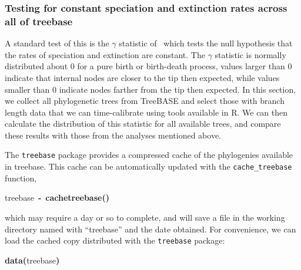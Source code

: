 \documentclass[authoryear, preprint]{elsarticle}
\makeatletter
\newcommand{\hlfunctioncall}[1]{\textcolor[rgb]{.5,0,.33}{\textbf{#1}}}%
\newcommand{\hlkeyword}[1]{\textbf{#1}}%
\newcommand{\hlassignement}[1]{\textbf{#1}}%
\newcommand{\hlsymbol}[1]{#1}%
\newenvironment{kframe}{%
 \def\FrameCommand##1{\hskip\@totalleftmargin \hskip-\fboxsep
 \colorbox{shadecolor}{##1}\hskip-\fboxsep
     \hskip-\linewidth \hskip-\@totalleftmargin \hskip\columnwidth}%
 \MakeFramed {\advance\hsize-\width
   \@totalleftmargin\z@ \linewidth\hsize
   \@setminipage}}%
 {\par\unskip\endMakeFramed}
\newenvironment{knitrout}{}{} %
\makeatother
\begin{document}
\subsubsection*{Testing for constant speciation and extinction rates across all of treebase}
A standard test of this is the $\gamma$ statistic of~\citet{Pybus2000}
which tests the null hypothesis that the rates of speciation and extinction are constant. 
The $\gamma$ statistic is normally distributed about 0 for a pure birth or birth-death process,
values larger than 0 indicate that internal nodes are closer to the tip then expected, 
while values smaller than 0 indicate nodes farther from the tip then expected.  
In this section, we collect all phylogenetic trees from TreeBASE and select those 
with branch length data that we can time-calibrate using tools available in R.
We can then calculate the distribution of this statistic for all available trees, 
and compare these results with those from the analyses mentioned above.  

The \texttt{treebase} package provides a compressed cache of the phylogenies available in treebase.  
This cache can be automatically updated with the \verb|cache_treebase| function,
\begin{knitrout}
\color{fgcolor}\begin{kframe}
\begin{flushleft}
\ttfamily\noindent
\hlsymbol{treebase}{\ }\hlassignement{\usebox{\hlnormalsizeboxlessthan}-}{\ }\hlfunctioncall{cache\usebox{\hlnormalsizeboxunderscore}treebase}\hlkeyword{(}\hlkeyword{)}\mbox{}
\normalfont
\end{flushleft}
\end{kframe}
\end{knitrout}

which may require a day or so to complete, 
and will save a file in the working directory named with ``treebase'' and the date obtained.  
For convenience, we can load the cached copy distributed with the \texttt{treebase} package:
\begin{knitrout}
\color{fgcolor}\begin{kframe}
\begin{flushleft}
\ttfamily\noindent
\hlfunctioncall{data}\hlkeyword{(}\hlsymbol{treebase}\hlkeyword{)}\mbox{}
\normalfont
\end{flushleft}
\end{kframe}
\end{knitrout}
\end{document}
